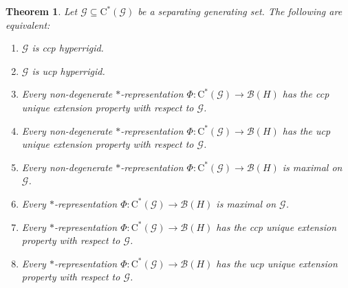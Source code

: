 \documentclass[10pt,a4paper]{amsart}
\newtheorem{theorem}{Theorem}
\newcommand{\B}{{\mathcal{B}}}
\newcommand{\G}{{\mathcal{G}}}
\newcommand{\ca}{\mathrm{C}^*}
\begin{document}
\begin{theorem}\label{T:hypiffuep}
Let $\G \subseteq \ca(\G)$ be a separating generating set.
The following are equivalent:
\begin{enumerate}
\item $\G$ is ccp hyperrigid.
\item $\G$ is ucp hyperrigid.
\item Every non-degenerate $*$-representation $\Phi \colon \ca(\G) \to \B(H)$ has the ccp unique extension property with respect to $\G$.
\item Every non-degenerate $*$-representation $\Phi \colon \ca(\G) \to \B(H)$ has the ucp unique extension property with respect to $\G$.
\item Every non-degenerate $*$-representation $\Phi \colon \ca(\G) \to \B(H)$ is maximal on $\G$.
\item Every $*$-representation $\Phi \colon \ca(\G) \to \B(H)$ is maximal on $\G$.
\item Every $*$-representation $\Phi \colon \ca(\G) \to \B(H)$ has the ccp unique extension property with respect to $\G$.
\item Every $*$-representation $\Phi \colon \ca(\G) \to \B(H)$ has the ucp unique extension property with respect to $\G$.
\end{enumerate}
\end{theorem}
\end{document}
